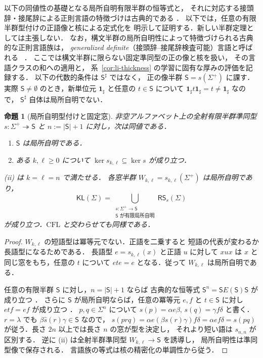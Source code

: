 \documentclass[11pt,a4paper]{ltjsarticle}
\newtheorem{proposition}[theorem]{命題}
\theoremstyle{remark}
\theoremstyle{plain}
\begin{document}
以下の同値性の基礎となる局所自明有限半群の恒等式と，
それに対応する接頭辞・接尾辞による正則言語の特徴づけは古典的である
\cite[Chapter~2, Proposition~3.5 and Theorem~3.6]{pin1986}．
以下では，任意の有限半群型付けの正語像と核による定式化を
明示して証明する．新しい半群定理としては主張しない．
なお，構文半群の局所自明性によって特徴づけられる古典的な正則言語族は，
\emph{generalized definite}（接頭辞--接尾辞検査可能）言語と呼ばれる
~\cite[Proposition~5.18]{pin1997}．
ここでは構文半群に限らない固定準同型の正の像と核を扱い，
その言語クラスの和への適用と，
系~\ref{cor:li-thickness} の学習に固有な厚みの評価を記録する．
以下の代数的条件は $\mathsf S^\sharp$ ではなく，
正の像半群 $\mathsf S=s(\Sigma^+)$ に課す．
実際 $\mathsf S\ne\emptyset$ のとき，新単位元
$\mathbf{1}_{\sharp}$ と任意の $t\in \mathsf S$ について
$\mathbf{1}_{\sharp} t\mathbf{1}_{\sharp}=t\ne\mathbf{1}_{\sharp}$ なので，
$\mathsf S^\sharp$ 自体は局所自明でない．

\begin{proposition}[局所自明型付けと固定窓]
\label{prop:li-window}
非空アルファベット上の全射有限半群準同型
$s:\Sigma^+\twoheadrightarrow\mathsf S$ と
$n:=|\mathsf S|+1$ に対し，次は同値である．
\begin{enumerate}[label=\textup{(\roman*)},nosep]
\item $\mathsf S$ は局所自明である．
\item ある $k,\ell\ge0$ について
$\ker s_{k,\ell}\subseteq\ker s$ が成り立つ．
\end{enumerate}
(ii) は $k=\ell=n$ で満たせる．
各窓半群 $W_{k,\ell}=s_{k,\ell}(\Sigma^+)$ は局所自明であり，
\[
\mathsf{KL}(\Sigma)=
\bigcup_{\substack{s:\Sigma^+\to\mathsf S\\
\mathsf S\text{ が有限局所自明}}}
\mathsf{RS}_s(\Sigma)
\]
が成り立つ．$\mathrm{CFL}$ と交わらせても同様である．
\end{proposition}
\begin{proof}
$W_{k,\ell}$ の短語型は冪等元でない．正語を二乗すると
短語の代表が変わるか長語型になるためである．
長語型 $e=s_{k,\ell}(x)$ と正語 $u$ に対して
$xux$ は $x$ と同じ窓をもち，任意の $t$ について
$ete=e$ となる．従って $W_{k,\ell}$ は局所自明である．

任意の有限半群 $\mathsf S$ に対し，$n=|\mathsf S|+1$ ならば
古典的な恒等式
$\mathsf S^n=\mathsf S E(\mathsf S)\mathsf S$
が成り立つ
\cite[Chapter~1, Proposition~1.12]{pin1986}．
さらに $\mathsf S$ が局所自明ならば，任意の冪等元 $e,f$ と
$t\in\mathsf S$ に対し $etf=ef$ が成り立つ
\cite[Chapter~2, Proposition~3.5]{pin1986}．
$p,q\in\Sigma^n$ について $s(p)=\alpha e\beta$, $s(q)=\gamma f\delta$
と書く．$r=\lambda$ でも $\beta\widehat s(r)\gamma\in\mathsf S$ なので，
$s(prq)=\alpha e(\beta\widehat s(r)\gamma)f\delta=\alpha ef\delta=s(pq)$
が従う．長さ $2n$ 以上では長さ $n$ の窓が型を決定し，
それより短い語は $s_{n,n}$ が区別する．
逆に (ii) は全射半群準同型
$W_{k,\ell}\to\mathsf S$ を誘導し，
局所自明性は準同型像で保存される．
言語族の等式は核の精密化の単調性から従う．
\end{proof}
\end{document}
